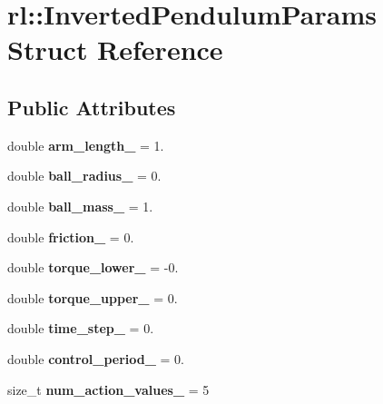 \hypertarget{structrl_1_1_inverted_pendulum_params}{}\section{rl\+:\+:Inverted\+Pendulum\+Params Struct Reference}
\label{structrl_1_1_inverted_pendulum_params}
\subsection*{Public Attributes}
\begin{DoxyCompactItemize}
\item 
\hypertarget{structrl_1_1_inverted_pendulum_params_aa3740df2ebb8cfa6b50a98e8f3ff45b5}{}\label{structrl_1_1_inverted_pendulum_params_aa3740df2ebb8cfa6b50a98e8f3ff45b5} 
double {\bfseries arm\+\_\+length\+\_\+} = 1.
\item 
\hypertarget{structrl_1_1_inverted_pendulum_params_a08c5cb3e29bab7210c79d90cefb66236}{}\label{structrl_1_1_inverted_pendulum_params_a08c5cb3e29bab7210c79d90cefb66236} 
double {\bfseries ball\+\_\+radius\+\_\+} = 0.
\item 
\hypertarget{structrl_1_1_inverted_pendulum_params_a537c61e8761707b0170b64b2a83ab9bb}{}\label{structrl_1_1_inverted_pendulum_params_a537c61e8761707b0170b64b2a83ab9bb} 
double {\bfseries ball\+\_\+mass\+\_\+} = 1.
\item 
\hypertarget{structrl_1_1_inverted_pendulum_params_a09baf94ced09a84a60d8d39d55a22f06}{}\label{structrl_1_1_inverted_pendulum_params_a09baf94ced09a84a60d8d39d55a22f06} 
double {\bfseries friction\+\_\+} = 0.
\item 
\hypertarget{structrl_1_1_inverted_pendulum_params_aeb9915bac0287412f3ab1ea1c004814b}{}\label{structrl_1_1_inverted_pendulum_params_aeb9915bac0287412f3ab1ea1c004814b} 
double {\bfseries torque\+\_\+lower\+\_\+} = -\/0.
\item 
\hypertarget{structrl_1_1_inverted_pendulum_params_a95595734352a78d15b146551520560d2}{}\label{structrl_1_1_inverted_pendulum_params_a95595734352a78d15b146551520560d2} 
double {\bfseries torque\+\_\+upper\+\_\+} = 0.
\item 
\hypertarget{structrl_1_1_inverted_pendulum_params_a620a4c6c74a7f01abe37e561515e4818}{}\label{structrl_1_1_inverted_pendulum_params_a620a4c6c74a7f01abe37e561515e4818} 
double {\bfseries time\+\_\+step\+\_\+} = 0.
\item 
\hypertarget{structrl_1_1_inverted_pendulum_params_a842cea406d0572174d1f10bd7b391aed}{}\label{structrl_1_1_inverted_pendulum_params_a842cea406d0572174d1f10bd7b391aed} 
double {\bfseries control\+\_\+period\+\_\+} = 0.
\item 
\hypertarget{structrl_1_1_inverted_pendulum_params_a78b83f4c51fd956ed7b36130955b86ce}{}\label{structrl_1_1_inverted_pendulum_params_a78b83f4c51fd956ed7b36130955b86ce} 
size\+\_\+t {\bfseries num\+\_\+action\+\_\+values\+\_\+} = 5
\end{DoxyCompactItemize}


